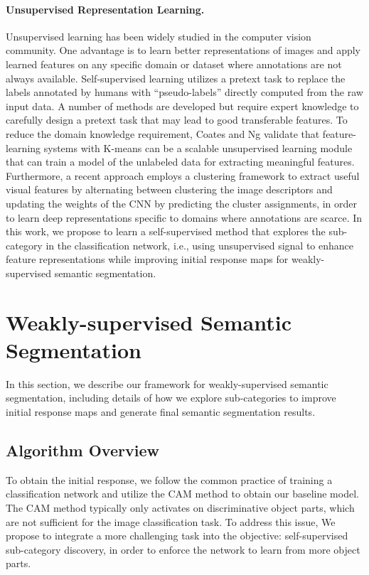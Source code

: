 \documentclass[10pt,twocolumn,letterpaper]{article}
\begin{document}
\paragraph{Unsupervised Representation Learning.}
Unsupervised learning has been widely studied in the computer vision community. One advantage is to learn better representations of images and apply learned features on any specific domain or dataset where annotations are not always available.
Self-supervised learning \cite{de1994learning} utilizes a pretext task to replace the labels annotated by humans with ``pseudo-labels'' directly computed from the raw input data.
A number of methods \cite{noroozi2016unsupervised, pathak2016context, paulin2015local} are developed but require expert knowledge to carefully design a pretext task that may lead to good transferable features.
To reduce the domain knowledge requirement, Coates and Ng \cite{coates2012learning} validate that feature-learning systems with K-means can be a scalable unsupervised learning module that can train a model of the unlabeled data for extracting meaningful features.
Furthermore, a recent approach \cite{caron2018deep} employs a clustering framework to extract useful visual features by 
alternating between clustering the image descriptors and updating the weights of the CNN by predicting the cluster assignments, in order to learn deep representations specific to domains where annotations are scarce.
In this work, we propose to learn a self-supervised method that explores the sub-category in the classification network, i.e., using unsupervised signal to enhance feature representations while improving initial response maps for weakly-supervised semantic segmentation.


\section{Weakly-supervised Semantic Segmentation}
In this section, we describe our framework for weakly-supervised semantic segmentation, including details of how we explore sub-categories to improve initial response maps and generate final semantic segmentation results.

\subsection{Algorithm Overview}


To obtain the initial response, we follow the common practice of training a classification network and utilize the CAM method \cite{zhou2016learning} to obtain our baseline model.
The CAM method typically only activates on discriminative object parts, which are not sufficient for the image classification task. To address this issue, We propose to integrate a more challenging task into the objective: self-supervised sub-category discovery, in order to enforce the network to learn from more object parts.
\end{document}
